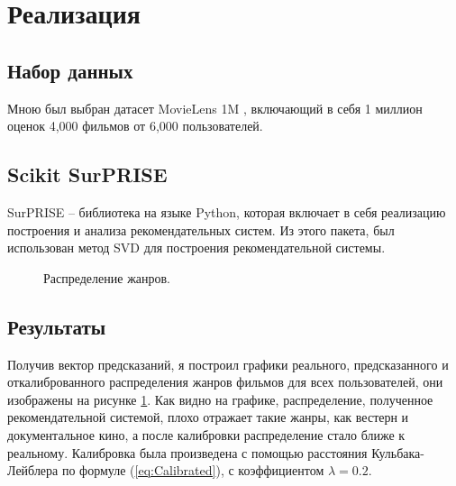 \section{Реализация}
\subsection{Набор данных}
Мною был выбран датасет MovieLens 1M \cite{voc3}, включающий в себя 1 миллион оценок 4,000 фильмов от 6,000 пользователей.
\subsection{Scikit SurPRISE}
SurPRISE \cite{voc4} -- библиотека на языке Python, которая включает в себя реализацию построения и анализа рекомендательных систем. 
Из этого пакета, был использован метод SVD для построения рекомендательной системы.
\begin{figure}[ht]
  \begin{center}
  
  \caption{
  \label{graph-fig}
       Распределение жанров.}
  \end {center}
  \end {figure}


  \subsection{Результаты}
  Получив вектор предсказаний, я построил графики реального, предсказанного и откалиброванного распределения жанров фильмов для всех пользователей, они изображены на рисунке \ref{graph-fig}. 
  Как видно на графике, распределение, полученное рекомендательной системой, плохо отражает такие жанры, как вестерн и документальное кино, а после калибровки распределение стало ближе к реальному. 
  Калибровка была произведена с помощью расстояния Кульбака-Лейблера по формуле (\ref{eq:Calibrated}), с коэффициентом $\lambda=0.2$.
  